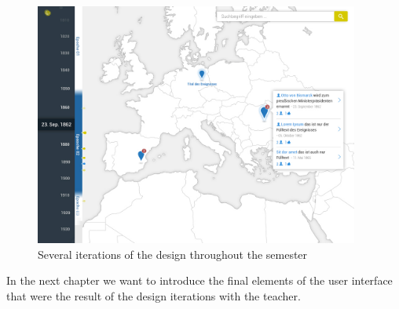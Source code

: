 \begin{figure}[H]
\begin{minipage}{0.32\textwidth}
  \end{minipage}
  \begin{minipage}{0.32\textwidth}
    \includegraphics[width=0.95\textwidth]{graphics/design-4.jpg}
  \end{minipage}
  \caption{Several iterations of the design throughout the semester}
\end{figure}

In the next chapter we want to introduce the final elements of the user interface that were the result of the design iterations with the teacher.
